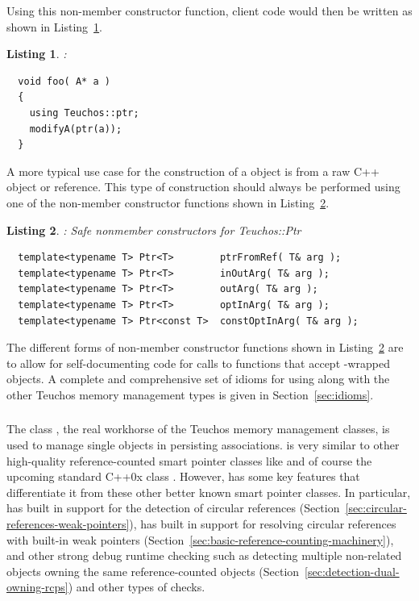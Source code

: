 \documentclass[pdf,ps2pdf,11pt]{SANDreport}
\newtheorem{listing}{Listing}
\begin{document}
Using this non-member constructor function, client code would then be
written as shown in Listing~\ref{listing:using-ptr}.

\begin{listing}:\\
\label{listing:using-ptr}
{\small\begin{verbatim}
  void foo( A* a )
  {
    using Teuchos::ptr;
    modifyA(ptr(a));
  }
\end{verbatim}}
\end{listing}

A more typical use case for the construction of a {} object
is from a raw C++ object or reference.  This type of construction
should always be performed using one of the non-member constructor
functions shown in
Listing~\ref{listing:ptr-from-ref-nonmember-constructors}.

\begin{listing}: Safe nonmember constructors for Teuchos::Ptr\\
\label{listing:ptr-from-ref-nonmember-constructors}
{\small\begin{verbatim}
  template<typename T> Ptr<T>        ptrFromRef( T& arg );
  template<typename T> Ptr<T>        inOutArg( T& arg );
  template<typename T> Ptr<T>        outArg( T& arg );
  template<typename T> Ptr<T>        optInArg( T& arg );
  template<typename T> Ptr<const T>  constOptInArg( T& arg );
\end{verbatim}}
\end{listing}

The different forms of non-member constructor functions shown in
Listing~\ref{listing:ptr-from-ref-nonmember-constructors} are to allow
for self-documenting code for calls to functions that accept
{}-wrapped objects.  A complete and comprehensive set of
idioms for using {} along with the other Teuchos memory
management types is given in Section~\ref{sec:idioms}.


%
{}\subsubsection{}
\label{sec:RCP}
%

The class {}, the real workhorse of the Teuchos memory
management classes, is used to manage single objects in persisting
associations.  {} is very similar to other high-quality
reference-counted smart pointer classes like
{} and of course the upcoming standard C++0x
class {}.  However, {} has some key
features that differentiate it from these other better known smart
pointer classes.  In particular, {} has built in support for
the detection of circular references
(Section~\ref{sec:circular-references-weak-pointers}), has built in
support for resolving circular references with built-in weak pointers
(Section~\ref{sec:basic-reference-counting-machinery}), and other
strong debug runtime checking such as detecting multiple non-related
{} objects owning the same reference-counted objects
(Section~\ref{sec:detection-dual-owning-rcps}) and other types of
checks.
\end{document}
